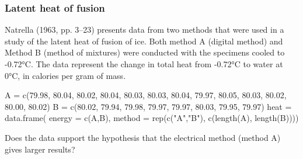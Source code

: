 \documentclass[a4paper]{article}
\begin{document}
\subsubsection{Latent heat of fusion}
Natrella (1963, pp. 3--23) presents data from two methods that were used in a study of the latent heat of fusion of ice. Both method A (digital method) and Method B (method of mixtures) were conducted with the specimens cooled to -0.72°C. The data represent the change in total heat from -0.72°C to water at 0°C, in calories per gram of mass.
\begin{Schunk}
\begin{Sinput}
A = c(79.98, 80.04, 80.02, 80.04, 80.03, 80.03, 80.04, 79.97, 
	80.05, 80.03, 80.02, 80.00, 80.02)
B = c(80.02, 79.94, 79.98, 79.97, 79.97, 80.03, 79.95, 79.97)
heat = data.frame(
	energy = c(A,B),
	method = rep(c("A","B"), c(length(A), length(B))))
\end{Sinput}
\end{Schunk}
\begin{goldbox}
	Does the data support the hypothesis that the electrical method (method A) gives larger results?
\end{goldbox}
\end{document}
